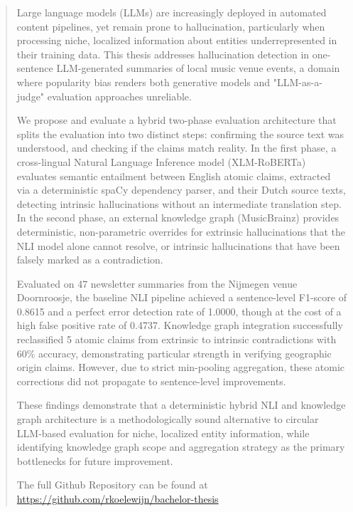 \begin{abstract}
Large language models (LLMs) are increasingly deployed in automated content pipelines, yet remain prone to hallucination, particularly when processing niche, localized information about entities underrepresented in their training data. This thesis addresses hallucination detection in one-sentence LLM-generated summaries of local music venue events, a domain where popularity bias renders both generative models and "LLM-as-a-judge" evaluation approaches unreliable.

We propose and evaluate a hybrid two-phase evaluation architecture that splits the evaluation into two distinct steps: confirming the source text was understood, and checking if the claims match reality. In the first phase, a cross-lingual Natural Language Inference model (XLM-RoBERTa) evaluates semantic entailment between English atomic claims, extracted via a deterministic spaCy dependency parser, and their Dutch source texts, detecting intrinsic hallucinations without an intermediate translation step. In the second phase, an external knowledge graph (MusicBrainz) provides deterministic, non-parametric overrides for extrinsic hallucinations that the NLI model alone cannot resolve, or intrinsic hallucinations that have been falsely marked as a contradiction.

Evaluated on 47 newsletter summaries from the Nijmegen venue Doornroosje, the baseline NLI pipeline achieved a sentence-level F1-score of 0.8615 and a perfect error detection rate of 1.0000, though at the cost of a high false positive rate of 0.4737. Knowledge graph integration successfully reclassified 5 atomic claims from extrinsic to intrinsic contradictions with 60\% accuracy, demonstrating particular strength in verifying geographic origin claims. However, due to strict min-pooling aggregation, these atomic corrections did not propagate to sentence-level improvements.

These findings demonstrate that a deterministic hybrid NLI and knowledge graph architecture is a methodologically sound alternative to circular LLM-based evaluation for niche, localized entity information, while identifying knowledge graph scope and aggregation strategy as the primary bottlenecks for future improvement.

The full Github Repository can be found at \url{https://github.com/rkoelewijn/bachelor-thesis}
\end{abstract}
